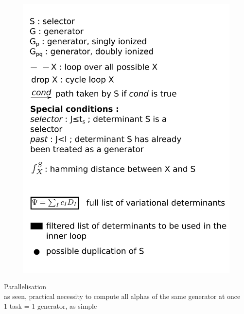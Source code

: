 \begin{figure}[ph!]
	\begin{center}
		\includegraphics[width=1.00\columnwidth]{figures/cipsi/selection_key}
		\caption{\label{fig:selection_key}}
	\end{center}
\end{figure}
    
Parallelisation \\
as seen, practical necessity to compute all alphas of the same generator at once \\
1 task = 1 generator, as simple \\
